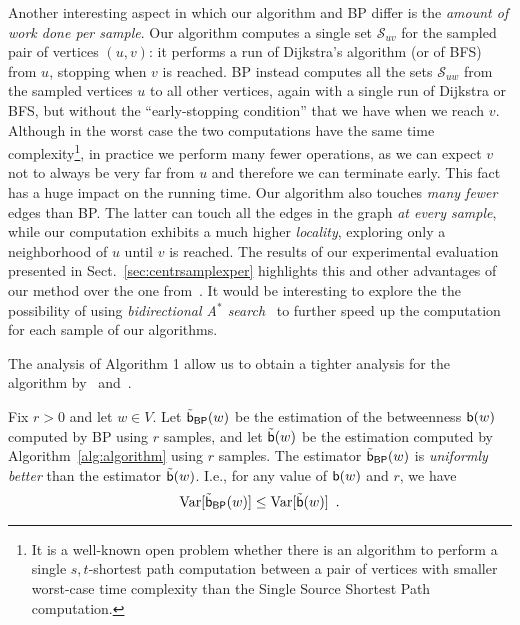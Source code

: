 Another interesting aspect in which our algorithm and \textsf{BP} differ is the
\emph{amount of work done per sample}. Our algorithm computes a single set
$\mathcal{S}_{uv}$ for the sampled pair of vertices $(u,v)$: it performs a run
of Dijkstra's algorithm (or of BFS) from $u$, stopping when $v$ is reached.
\textsf{BP} instead computes all the sets $\mathcal{S}_{uw}$ from the sampled
vertices $u$ to all other vertices, again with a single run of Dijkstra or BFS,
but without the ``early-stopping condition'' that we have when we reach $v$.
Although in the worst case the two computations have the same time
complexity\footnote{It is a well-known open problem whether there is an
algorithm to perform a single $s,t$-shortest path computation between a pair of
vertices with smaller worst-case time complexity than the Single Source Shortest
Path computation.}, in practice we perform many fewer operations, as we can
expect $v$ not to always be very far from $u$ and therefore we can terminate
early. This fact has a huge impact on the running time. Our algorithm also
touches \emph{many fewer} edges than \textsf{BP}. The latter can touch all the
edges in the graph \emph{at every sample}, while our computation exhibits a much
higher \emph{locality}, exploring only a neighborhood of $u$ until $v$ is
reached. The results of our experimental evaluation presented in
Sect.~\ref{sec:centrsamplexper} highlights this and other advantages of our method over
the one from~\citep{JacobKLPT05,BrandesP07}. 
It would be interesting to explore the %
the possibility of using \emph{bidirectional A$^*$
search}~\citep{Pohl69,KaindlK97} to further speed up the computation for each
sample of our algorithms.

The analysis of Algorithm 1 allow us to obtain a tighter analysis for the
algorithm by~\citet{BrandesP07} and~\citet{JacobKLPT05}.

\begin{lemma}\label{lem:variance}
  Fix $r>0$ and let $w\in V$. Let $\tilde{\mathsf{b}}_\mathsf{BP}(w)$ be the estimation
  of the betweenness $\mathsf{b}(w)$ computed by \textsf{BP} using $r$ samples, and
  let $\tilde{\mathsf{b}}(w)$ be the estimation computed by
  Algorithm~\ref{alg:algorithm} using $r$ samples. The estimator
  $\tilde{\mathsf{b}}_\mathsf{BP}(w)$ is \emph{uniformly better} than the estimator
  $\tilde{\mathsf{b}}(w)$. I.e., for any value of $\mathsf{b}(w)$ and $r$, we have
  \[
  \mathrm{Var}[\tilde{\mathsf{b}}_\mathsf{BP}(w)]\le\mathrm{Var}[\tilde{\mathsf{b}}(w)]\enspace.
  \]
\end{lemma}

